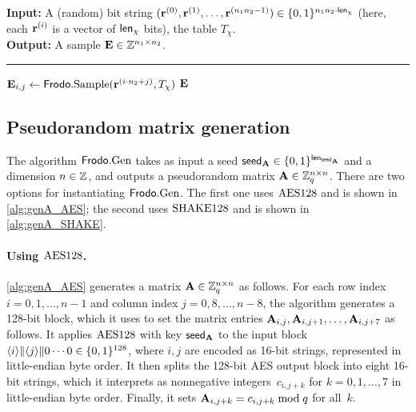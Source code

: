\documentclass{iacrcc}
\begin{document}
\begin{algorithm}[H]
\caption{\label{alg:samplevecchi} $\Frodo.\SampV$}
{\bf Input:} A (random) bit string $(\mathbf{r}^{(0)}, \mathbf{r}^{(1)}, \dots, \mathbf{r}^{(n_1n_2-1)}) \in \{0,1\}^{n_1n_2 \cdot {\mathsf{len}_{\chi}}}$ (here, each $\mathbf{r}^{(i)}$ is a vector of ${\mathsf{len}_{\chi}}$ bits), the
  table $T_{\chi}$.\\
{\bf Output:} A sample $\mathbf{E} \in \mathbb{Z}^{n_1\times n_2}$.\\[-1.5ex]
\rule{\linewidth}{.5pt}
\vspace{-0.5cm}
\begin{algorithmic}[1]
    \STATE $\mathbf{E}_{i,j} \gets \textsf{\upshape\mdseries Frodo}.\textrm{\upshape\mdseries Sample}(\mathbf{r}^{(i\cdot n_2 + j)}, T_\chi)$
    \ENDFOR
    \ENDFOR
    \RETURN$\mathbf{E}$
\end{algorithmic}
\end{algorithm}

\subsection{Pseudorandom matrix generation}
\label{sec:genA}

The algorithm $\textsf{\upshape\mdseries Frodo}.\textrm{\upshape\mdseries Gen}$ takes as input a seed
${\mathsf{seed}_{\mathbf{A}}}\in\{0,1\}^{\mathsf{len}_{{\mathsf{seed}_{\mathbf{A}}}}}$ and a dimension $n\in\mathbb{Z}$, and outputs
a pseudorandom matrix $\mathbf{A}\in \mathbb{Z}_q^{n\times n}$. There are two
options for instantiating $\textsf{\upshape\mdseries Frodo}.\textrm{\upshape\mdseries Gen}$. The first one uses
$\textrm{\upshape\mdseries AES128}$ and is shown in	 \autoref{alg:genA_AES}; the second
uses $\textrm{\upshape\mdseries SHAKE}128$ and is shown in \autoref{alg:genA_SHAKE}.

\paragraph{Using $\textrm{\upshape\mdseries AES128}$.}

\autoref{alg:genA_AES} generates a matrix
$\mathbf{A} \in \mathbb{Z}_{q}^{n\times n}$ as follows.  For each row
index $i=0,1,\ldots,n-1$ and column index $j=0,8,\ldots,n-8$, the
algorithm generates a 128-bit block, which it uses to set the matrix
entries $\mathbf{A}_{i,j}, \mathbf{A}_{i,j+1}, \ldots, \mathbf{A}_{i,j+7}$ as follows.  It
applies $\textrm{\upshape\mdseries AES128}$ with key ${\mathsf{seed}_{\mathbf{A}}}$ to the input block
$\langle i\rangle \| \langle j\rangle \| 0 \cdots 0 \in \{0,1\}^{128}$, where $i,j$ are
encoded as 16-bit strings, represented in little-endian byte order. It then splits the 128-bit AES output block
into eight 16-bit strings, which it interprets as nonnegative
integers~$c_{i,j+k}$ for $k=0,1,\ldots,7$ in little-endian byte order.  Finally, it sets
$\mathbf{A}_{i,j+k}= c_{i,j+k} \bmod q$ for all~$k$.
\end{document}
